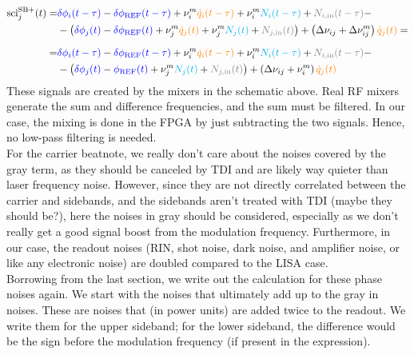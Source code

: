 \documentclass[11pt]{article}
\begin{document}
\begin{align*}
    \text{sci}_j^{\text{SB}+}(t) = &{\color{blue}\delta \phi_{i}(t-\tau)}-{\color{blue}\delta \phi_{\text{REF}}(t-\tau)} + \nu_{i}^m {\color{orange}\dot{q}_i(t-\tau)} +  \nu_{i}^m{\color{cyan}N_{i}(t-\tau)}+  {\color{gray}N_{i,\text{in}}(t-\tau)} -\\
    &-\left({\color{blue}\delta \phi_{j}(t)}-{\color{blue}\delta \phi_{\text{REF}}(t)} + \nu_{j}^m{\color{orange}\dot{q}_j(t)} +  \nu_{j}^m{\color{cyan}N_{j}(t)}+  {\color{gray}N_{j,\text{in}}(t)}\right)+ \left(\Delta\nu_{ij}+\Delta\nu^m_{ij}\right){\color{orange}\dot{q}_j(t)}=\\[6pt]
    = &{\color{blue}\delta \phi_{i}(t-\tau)}-{\color{blue}\delta \phi_{\text{REF}}(t-\tau)} + \nu_{i}^m {\color{orange}\dot{q}_i(t-\tau)} +  \nu_{i}^m{\color{cyan}N_{i}(t-\tau)}+  {\color{gray}N_{i,\text{in}}(t-\tau)} -\\
    &-\left({\color{blue}\delta \phi_{j}(t)}-{\color{blue}\phi_{\text{REF}}(t)} +  \nu_{j}^m{\color{cyan}N_{j}(t)}+  {\color{gray}N_{j,\text{in}}(t)}\right)+ \left(\Delta\nu_{ij}+\nu^m_{i}\right){\color{orange}\dot{q}_j(t)}
\end{align*}
These signals are created by the mixers in the schematic above. Real RF mixers generate the sum and difference frequencies, and the sum must be filtered. In our case, the mixing is done in the FPGA by just subtracting the two signals. Hence, no low-pass filtering is needed.\\
\newline
For the carrier beatnote, we really don't care about the noises covered by the gray term, as they should be canceled by TDI and are likely way quieter than laser frequency noise. However, since they are not directly correlated between the carrier and sidebands, and the sidebands aren't treated with TDI (maybe they should be?), here the noises in gray should be considered, especially as we don't really get a good signal boost from the modulation frequency. Furthermore, in our case, the readout noises (RIN, shot noise, dark noise, and amplifier noise, or like any electronic noise) are doubled compared to the LISA case.\\
\newline
Borrowing from the last section, we write out the calculation for these phase noises again. We start with the noises that ultimately add up to the gray $\text{in}$ noises. These are noises that (in power units) are added twice to the readout. We write them for the upper sideband; for the lower sideband, the difference would be the sign before the modulation frequency (if present in the expression).
\end{document}
